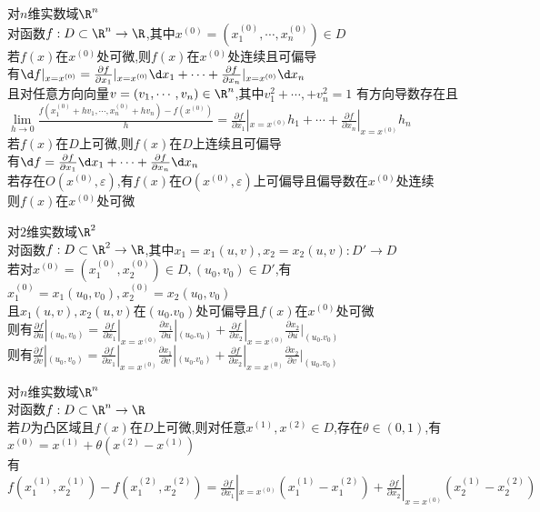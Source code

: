 \begin{dingli}
对$n$维实数域$\R^n$\\
对函数$f:D\subset \R^n \to \R$,其中$x^{(0)}=(x_1^{(0)},\cdots,x_n^{(0)})\in D$\\
若$f(x)$在$x^{(0)}$处可微,则$f(x)$在$x^{(0)}$处连续且可偏导\\
有$\d f|_{x=x^{(0)}}=\frac{\partial f}{\partial x_1}|_{x=x^{(0)}}\d x_1+\cdots+\frac{\partial f}{\partial x_n}|_{x=x^{(0)}}\d x_n$\\
且对任意方向向量$v=(v_1,\cdots,v_n)\in\R^n$,其中$v_1^2+\cdots,+v_n^2=1$
有方向导数存在且$\lim\limits_{h\to 0}\frac{f(x_1^{(0)}+hv_1,\cdots,x_n^{(0)}+hv_n)-f(x^{(0)})}{h}=\frac{\partial f}{\partial x_1}|_{x=x^{(0)}}h_1+\cdots+\frac{\partial f}{\partial x_n}|_{x=x^{(0)}}h_n$\\
若$f(x)$在$D$上可微,则$f(x)$在$D$上连续且可偏导\\
有$\d f=\frac{\partial f}{\partial x_1}\d x_1+\cdots+\frac{\partial f}{\partial x_n}\d x_n$\\
若存在$O(x^{(0)},\varepsilon)$,有$f(x)$在$O(x^{(0)},\varepsilon)$上可偏导且偏导数在$x^{(0)}$处连续\\
则$f(x)$在$x^{(0)}$处可微
\end{dingli}

\begin{dingli}
对$2$维实数域$\R^2$\\
对函数$f:D\subset\R^2\to\R$,其中$x_1=x_1(u,v),x_2=x_2(u,v):D'\to D$\\
若对$x^{(0)}=(x_1^{(0)},x_2^{(0)})\in D,(u_0,v_0)\in D'$,有$x_1^{(0)}=x_1(u_0,v_0),x_2^{(0)}=x_2(u_0,v_0)$\\
且$x_1(u,v),x_2(u,v)$在$(u_0.v_0)$处可偏导且$f(x)$在$x^{(0)}$处可微\\
则有$\frac{\partial f}{\partial u}|_{(u_0,v_0)}=\frac{\partial f}{\partial x_1}|_{x=x^{(0)}}\frac{\partial x_1}{\partial u}|_{(u_0.v_0)}+\frac{\partial f}{\partial x_2}|_{x=x^{(0)}}\frac{\partial x_2}{\partial u}|_{(u_0.v_0)}$\\
则有$\frac{\partial f}{\partial v}|_{(u_0,v_0)}=\frac{\partial f}{\partial x_1}|_{x=x^{(0)}}\frac{\partial x_1}{\partial v}|_{(u_0.v_0)}+\frac{\partial f}{\partial x_2}|_{x=x^{(0)}}\frac{\partial x_2}{\partial v}|_{(u_0.v_0)}$
\end{dingli}

\begin{dingli}
对$n$维实数域$\R^n$\\
对函数$f:D\subset \R^n \to \R$\\
若$D$为凸区域且$f(x)$在$D$上可微,则对任意$x^{(1)},x^{(2)}\in D$,存在$\theta\in (0,1)$,有$x^{(0)}=x^{(1)}+\theta(x^{(2)}-x^{(1)})$\\
有$f(x_1^{(1)},x_2^{(1)})-f(x_1^{(2)},x_2^{(2)})=\frac{\partial f}{\partial x_1}|_{x=x^{(0)}}(x_1^{(1)}-x_1^{(2)})+\frac{\partial f}{\partial x_2}|_{x=x^{(0)}}(x_2^{(1)}-x_2^{(2)})$
\end{dingli}

